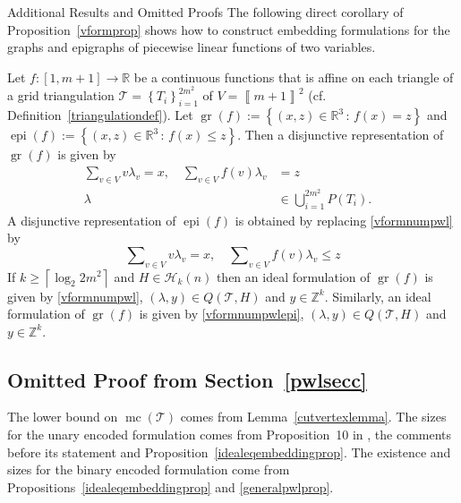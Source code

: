 \documentclass[mnsc]{informs3}
\newcommand{\set}[1]{\left\{#1\right\}}                     %
\newcommand{\bra}[1]{\left(#1\right)}
\newcommand{\sidx}[1]{\left\llbracket     #1 \right\rrbracket}
\newcommand{\Real}{\mathbb R}
\DeclareMathOperator{\mmc}{mc}
\DeclareMathOperator{\gr}{gr}
\DeclareMathOperator{\epi}{epi}
\begin{document}
\begin{APPENDIX}{Additional Results and Omitted Proofs}
The following direct corollary of Proposition~\ref{vformprop} shows how to construct embedding formulations for the graphs and epigraphs of piecewise linear functions of two variables. 
\begin{corollary}Let $f:[1,m+1]\to \Real$ be a continuous functions that is affine on each triangle of a grid triangulation $\mathcal{T}=\set{T_i}_{i=1}^{2m^2}$ of  $V=\sidx{m+1}^2$ (cf. Definition~\ref{triangulationdef}). Let $\gr(f):=\set{\bra{x,z}\in \Real^3\,:\, f(x)=z}$ and $\epi(f):=\set{\bra{x,z}\in \Real^3\,:\, f(x)\leq z}$. Then a disjunctive representation of $\gr(f)$ is given by  
  \begin{subequations}\label{vformexunionpwl}
      \begin{alignat}{3}
    \sum\nolimits_{v\in V}  v \lambda_{v}=x,\quad \sum\nolimits_{v\in V}  f(v) \lambda_{v}&=z&\label{vformnumpwl}\\
            \lambda&\in \bigcup_{i=1}^{2m^2} P\bra{T_i}.
    \end{alignat}
  \end{subequations}
  A disjunctive representation of $\epi(f)$ is obtained by replacing \eqref{vformnumpwl} by
  \begin{equation}
  \sum\nolimits_{v\in V}  v \lambda_{v}=x,\quad \sum\nolimits_{v\in V}  f(v) \lambda_{v}\leq z\label{vformnumpwlepi}
  \end{equation}
If $k\geq \left\lceil \log_2 2m^2\right\rceil$ and $H\in \mathcal{H}_k(n)$ then an ideal formulation of $\gr(f)$ is given by \eqref{vformnumpwl}, $\bra{\lambda,y}\in Q\bra{\mathcal{T},H} $ and $y\in \mathbb{Z}^k$. Similarly, an ideal formulation of $\gr(f)$ is given by \eqref{vformnumpwlepi}, $\bra{\lambda,y}\in Q\bra{\mathcal{T},H} $ and $y\in \mathbb{Z}^k$.
\end{corollary}
\subsection{Omitted Proof from Section~\ref{pwlsecc}}\label{unionjackcoroapendix}
\unionjackboundprop*
{}
The lower bound on $\mmc\bra{\mathcal{T}}$ comes from Lemma~\ref{cutvertexlemma}. The sizes for the unary encoded formulation comes from Proposition~10 in \cite{lee01}, the comments before its statement and Proposition~\ref{idealeqembeddingprop}. The existence and sizes for the binary encoded formulation come from Propositions~\ref{idealeqembeddingprop} and \ref{generalpwlprop}.
\Halmos\endproof


\end{APPENDIX}
\end{document}
